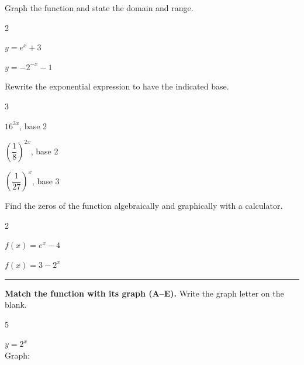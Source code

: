 \documentclass[11pt]{article}
\begin{document}
    \noindent Graph the function and state the domain and range.

    \begin{enumerate}

        \begin{multicols}{2}
            \item $\displaystyle y = e^x + 3$\\[1ex]\smallgraph
            \item $\displaystyle y = -2^{-x} - 1$\\[1ex]\smallgraph
        \end{multicols}

        \vspace{1ex}

        \noindent Rewrite the exponential expression to have the indicated base.

        \begin{multicols}{3}
            \item $\displaystyle 16^{3x}$, base 2\\[4ex]
            \item $\displaystyle \left(\dfrac{1}{8}\right)^{2x}$, base 2\\[4ex]
            \item $\displaystyle \left(\dfrac{1}{27}\right)^{x}$, base 3\\[4ex]
        \end{multicols}

        \noindent Find the zeros of the function algebraically and graphically with a calculator.

        \begin{multicols}{2}
            \item $\displaystyle f(x) = e^x - 4$\\[4ex]
            \item $\displaystyle f(x) = 3 - 2^x$\\[4ex]
        \end{multicols}

        \vspace{1ex}
        \noindent\rule{\textwidth}{0.8pt}

        \noindent\textbf{Match the function with its graph (A--E).} Write the graph letter on the blank.

        \vspace{1ex}

        \begin{multicols}{5}
            \item $\displaystyle y = 2^x$\\[1ex]
            Graph: \underline{\hspace{1.8cm}}


\end{multicols}
\end{enumerate}
\end{document}
